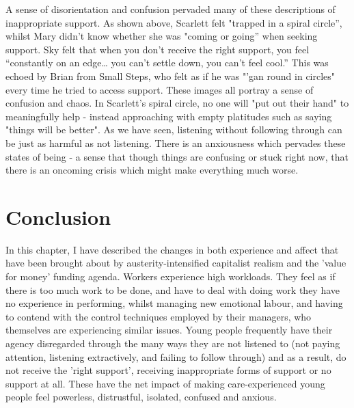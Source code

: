 A sense of disorientation and confusion pervaded many of these descriptions of inappropriate support. As shown above, Scarlett felt "trapped in a spiral circle”, whilst Mary didn’t know whether she was "coming or going” when seeking support. Sky felt that when you don’t receive the right support, you feel “constantly on an edge… you can’t settle down, you can’t feel cool.” This was echoed by Brian from Small Steps, who felt as if he was "'gan round in circles" every time he tried to access support. These images all portray a sense of confusion and chaos. In Scarlett's spiral circle, no one will "put out their hand" to meaningfully help - instead approaching with empty platitudes such as saying "things will be better". As we have seen, listening without following through can be just as harmful as not listening. There is an anxiousness which pervades these states of being - a sense that though things are confusing or stuck right now, that there is an oncoming crisis which might make everything much worse. 

\section{Conclusion}
In this chapter, I have described the changes in both experience and affect that have been brought about by austerity-intensified capitalist realism and the 'value for money' funding agenda. Workers experience high workloads. They feel as if there is too much work to be done, and have to deal with doing work they have no experience in performing, whilst managing new emotional labour, and having to contend with the control techniques employed by their managers, who themselves are experiencing  similar issues. Young people frequently have their agency disregarded through the many ways they are not listened to (not paying attention, listening extractively, and failing to follow through) and as a result, do not receive the 'right support', receiving inappropriate forms of support or no support at all. These have the net impact of making care-experienced young people feel powerless, distrustful, isolated, confused and anxious. 

